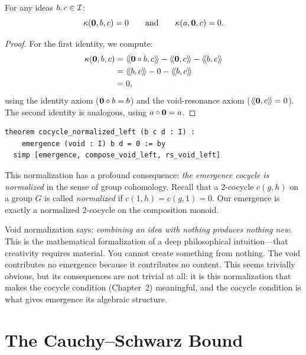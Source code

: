 \begin{theorem}
\label{thm:void-normalization}
For any ideas $b, c \in \mathcal{I}$:
\[
  \kappa(\mathbf{0}, b, c) = 0 \qquad\text{and}\qquad \kappa(a, \mathbf{0}, c) = 0.
\]
\end{theorem}

\begin{proof}
For the first identity, we compute:
\begin{align*}
\emerge(\void, b, c) &= \rs{\void \compose b}{c} - \rs{\void}{c} - \rs{b}{c} \\
&= \rs{b}{c} - 0 - \rs{b}{c} \\
&= 0,
\end{align*}
using the identity axiom ($\mathbf{0} \circ b = b$) and the void-resonance axiom
($\langle\!\langle \mathbf{0}, c \rangle\!\rangle = 0$). The second identity is analogous, using $a \circ \mathbf{0} = a$.
\end{proof}

\begin{lstlisting}[caption={Void normalization in Lean (IDT\_v3\_Emergence.lean)}]
theorem cocycle_normalized_left (b c d : I) :
    emergence (void : I) b d = 0 := by
  simp [emergence, compose_void_left, rs_void_left]
\end{lstlisting}

This normalization has a profound consequence: \emph{the emergence cocycle is
normalized} in the sense of group cohomology. Recall that a 2-cocycle $c(g,h)$
on a group $G$ is called \emph{normalized} if $c(1,h) = c(g,1) = 0$. Our
emergence is exactly a normalized 2-cocycle on the composition monoid.

\begin{interpretation}
Void normalization says: \emph{combining an idea with nothing produces nothing
new}. This is the mathematical formalization of a deep philosophical intuition---that
creativity requires material. You cannot create something from nothing. The void
contributes no emergence because it contributes no content. This seems trivially
obvious, but its consequences are not trivial at all: it is this normalization
that makes the cocycle condition (Chapter~2) meaningful, and the cocycle condition
is what gives emergence its algebraic structure.
\end{interpretation}


\section{The Cauchy--Schwarz Bound}

